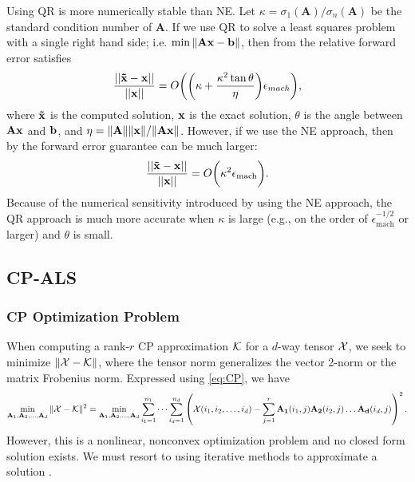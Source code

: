 \documentclass{article}
\newcommand{\mat}[1]{\mathbf{#1}}
\newcommand{\V}[2][]{\bm{#1{\mathbf{\MakeLowercase{#2}}}}} 		%
\newcommand{\T}[2][]{#1{\mathbf{\cal{#2}}}} 						%
\begin{document}
Using QR is more numerically stable than NE. 
Let $\kappa = \sigma_1(\mat{A})/\sigma_n(\mat{A})$ be the standard condition number of $\mat{A}$.
If we use QR to solve a least squares problem with a single right hand side; i.e. $\min\|\mat{A}\V{x} - \V{b} \|$, then from \cite[Eq. (19.2)]{trefethen1997numerical} the relative forward error satisfies
\begin{equation}
  \frac{||\V[\tilde]{x} - \V{x}||}{||\V{x}||} = O \biggl(\biggl(\kappa + \frac{\kappa^2\tan\theta}{\eta}\biggr)\epsilon_{mach}\biggr),
\end{equation}
where $\V[\tilde]{x}$ is the computed solution, $\V{x}$ is the exact solution, $\theta$ is the angle between $\mat{A}\V{x}$ and $\V{b}$, and $\eta = \|\mat{A}\|\|\V{x}\|/\|\mat{A}\V{x}\|$.
However, if we use the NE approach, then by \cite[Eq. (19.3)]{trefethen1997numerical} the forward error guarantee can be much larger: 
\begin{equation}
  \frac{||\V[\tilde]{x} - \V{x}||}{||\V{x}||} = O \biggl(\kappa^2 \epsilon_{\text{mach}}\biggr).
\end{equation}
Because of the numerical sensitivity introduced by using the NE approach, the QR approach is much more accurate when $\kappa$ is large (e.g., on the order of $\epsilon_{\text{mach}}^{-1/2}$ or larger) and $\theta$ is small.


\subsection{CP-ALS} \label{sec:cp-als}

\subsubsection{CP Optimization Problem}

When computing a rank-$r$ CP approximation $\T{K}$ for a $d$-way tensor $\T{X}$, we seek to minimize $\| \T{X} - \T{K} \|$, where the tensor norm generalizes the vector 2-norm or the matrix Frobenius norm.
Expressed using \cref{eq:CP}, we have  
$$\min_{\mat{A}_1,\mat{A}_2, \dots,\mat{A}_d} \| \T{X} - \T{K} \|^2 = \min_{\mat{A}_1,\mat{A}_2, \dots,\mat{A}_d} \sum_{i_1=1}^{n_1} \cdots \sum_{i_d=1}^{n_d} \left(\T{X}(i_1,i_2,\dots, i_d) - \sum^{r}_{j=1} \mat{A_1}(i_1,j)\mat{A_2}(i_2,j) \dots \mat{A_d}(i_d,j) \right)^2. $$
However, this is a nonlinear, nonconvex optimization problem and no closed form solution exists. 
We must resort to using iterative methods to approximate a solution \cite{kolda2009tensor}.
\end{document}
